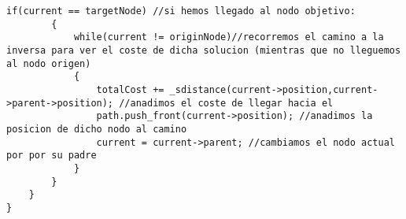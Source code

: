 \begin{lstlisting}[frame=single,basicstyle=\tiny,title={Algoritmo De Encontrar el Camino}]
    	if(current == targetNode) //si hemos llegado al nodo objetivo:
     	{
     		while(current != originNode)//recorremos el camino a la inversa para ver el coste de dicha solucion (mientras que no lleguemos al nodo origen)
     		{
     			totalCost += _sdistance(current->position,current->parent->position); //anadimos el coste de llegar hacia el
     			path.push_front(current->position); //anadimos la posicion de dicho nodo al camino
     			current = current->parent; //cambiamos el nodo actual por por su padre
			}
    	}	
    }
}
\end{lstlisting}
